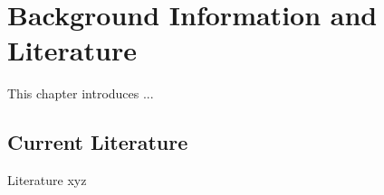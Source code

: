 \chapter{Background Information and Literature}
\label{ch:background}
This chapter introduces ...

\section{Current Literature}
\label{sec:background:literature}
Literature xyz